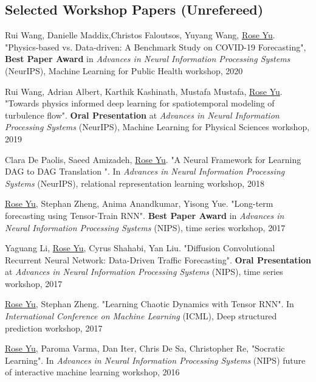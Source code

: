 \documentclass[margin,line]{res}
\begin{document}
\begin{resume}
\section{\sc Selected
Workshop
Papers
(Unrefereed) }
\begin{enumerate}[label={[W\arabic*]}]

\item Rui Wang, Danielle Maddix,Christos Faloutsos, Yuyang Wang, \underline{Rose Yu}. "Physics-based vs. Data-driven: A Benchmark Study on COVID-19 Forecasting",  \textbf{Best Paper Award}  in \textit{Advances in Neural Information Processing Systems} (NeurIPS), Machine Learning for Public Health workshop, 2020



\item Rui Wang, Adrian Albert, Karthik Kashinath, Mustafa Mustafa, \underline{Rose Yu}. "Towards physics informed deep learning for spatiotemporal modeling of turbulence flow". \textbf{Oral Presentation} at \textit{Advances in Neural Information Processing Systems} (NeurIPS), Machine Learning for Physical Sciences  workshop, 2019

\item Clara De Paolis, Saeed Amizadeh, \underline{Rose Yu}.  "A Neural Framework for Learning DAG to DAG Translation ". In  \textit{Advances in Neural Information Processing Systems} (NeurIPS), relational representation learning workshop, 2018

\item \underline{Rose Yu}, Stephan Zheng, Anima Anandkumar, Yisong Yue. "Long-term forecasting using Tensor-Train RNN". \textbf{Best Paper Award}  in \textit{Advances in Neural Information Processing Systems} (NIPS), time series workshop, 2017


\item Yaguang Li, \underline{Rose Yu}, Cyrus Shahabi, Yan Liu. "Diffusion Convolutional Recurrent Neural Network: Data-Driven Traffic Forecasting". \textbf{Oral Presentation} at \textit{Advances in Neural Information Processing Systems} (NIPS), time series workshop, 2017


\item \underline{Rose Yu}, Stephan Zheng. "Learning Chaotic Dynamics with Tensor RNN". In  \textit{International Conference on Machine Learning} (ICML), Deep structured prediction workshop, 2017

\item \underline{Rose Yu},  Paroma Varma, Dan Iter, Chris De Sa, Christopher Re,  "Socratic Learning".  In \textit{Advances in Neural Information Processing Systems}  (NIPS) future of interactive machine learning workshop, 2016


\end{enumerate}
\end{resume}
\end{document}
